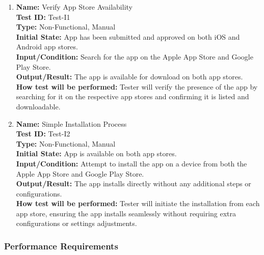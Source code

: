 \documentclass[12pt, titlepage]{article}
\begin{document}
\begin{enumerate}
  \item \textbf{Name:} Verify App Store Availability \label{itm:Test-I1} \\
        \textbf{Test ID:} Test-I1 \\
        \textbf{Type:} Non-Functional, Manual \\
        \textbf{Initial State:} App has been submitted and approved on both iOS and Android app stores. \\
        \textbf{Input/Condition:} Search for the app on the Apple App Store and Google Play Store. \\
        \textbf{Output/Result:} The app is available for download on both app stores. \\
        \textbf{How test will be performed:} Tester will verify the presence of the app by searching for it on the respective app stores and confirming it is listed and downloadable.

  \item \textbf{Name:} Simple Installation Process \label{itm:Test-I2} \\
        \textbf{Test ID:} Test-I2 \\
        \textbf{Type:} Non-Functional, Manual \\
        \textbf{Initial State:} App is available on both app stores. \\
        \textbf{Input/Condition:} Attempt to install the app on a device from both the Apple App Store and Google Play Store. \\
        \textbf{Output/Result:} The app installs directly without any additional steps or configurations. \\
        \textbf{How test will be performed:} Tester will initiate the installation from each app store, ensuring the app installs seamlessly without requiring extra configurations or settings adjustments.
\end{enumerate}

\subsubsection{Performance Requirements}
\end{document}
